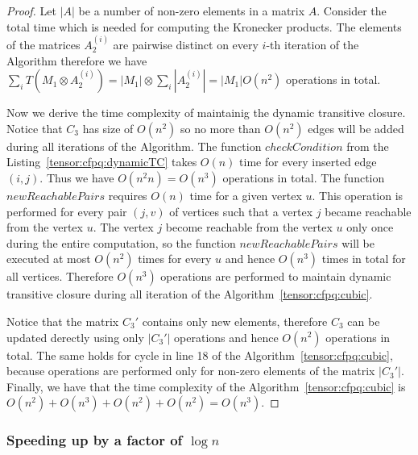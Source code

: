 \begin{proof}
 Let $|A|$ be a number of non-zero elements in a matrix $A$. Consider the total time which is needed for computing the Kronecker products. The elements of the matrices $A_2^{(i)}$ are pairwise distinct on every $i$-th iteration of the Algorithm therefore we have $\sum\limits_i{T(M_1 \otimes A_2^{(i)})} = |M_1| \otimes \sum\limits_i {|A_2^{(i)}|} = |M_1|O(n^2)$ operations in total. 


Now we derive the time complexity of maintainig the dynamic transitive closure. Notice that $C_3$ has size of $O(n^2)$ so no more than $O(n^2)$ edges will be added during all iterations of the Algorithm. The function $checkCondition$ from the Listing~\ref{tensor:cfpq:dynamicTC} takes $O(n)$ time for every inserted edge $(i, j)$. Thus we have $O(n^2n) = O(n^3)$ operations in total. The function $newReachablePairs$ requires $O(n)$ time for a given vertex $u$. This operation is performed for every pair $(j, v)$ of vertices such that a vertex $j$ became reachable from the vertex $u$. The vertex $j$ become reachable from the vertex $u$ only once during the entire computation, so the function $newReachablePairs$ will be executed at most $O(n^2)$ times for every $u$ and hence $O(n^3)$ times in total for all vertices. Therefore $O(n^3)$ operations are performed to maintain dynamic transitive closure during all iteration of the Algorithm~\ref{tensor:cfpq:cubic}.


Notice that the matrix $C_3'$ contains only new elements, therefore $C_3$ can be updated derectly using only $|C_3'|$ operations and hence $O(n^2)$ operations in total. The same holds for cycle in line 18 of the Algorithm~\ref{tensor:cfpq:cubic}, because operations are performed only for non-zero elements of the matrix $|C_3'|$. Finally, we have that the time complexity of the Algorithm~\ref{tensor:cfpq:cubic} is $O(n^2) + O(n^3) + O(n^2) + O(n^2) = O(n^3)$.
\end{proof}{}

\subsubsection{Speeding up by a factor of $\log n$}

